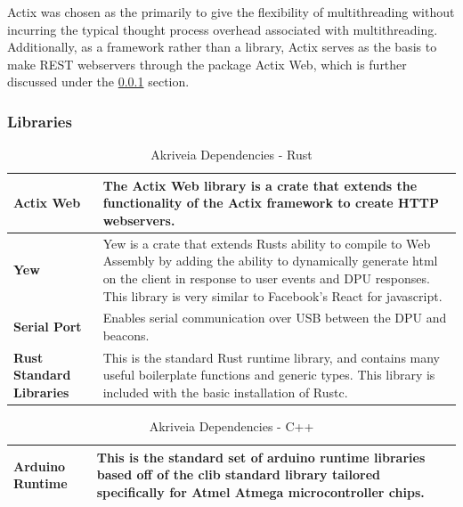 \bigskip
Actix was chosen as the primarily to give the flexibility of multithreading without incurring the typical thought process overhead associated with multithreading. Additionally, as a framework rather than a library, Actix serves as the basis to make REST webservers through the package \Gls{Actix Web}, which is further discussed under the \ref{software_libraries} section.

\subsubsection{Libraries}
\label{software_libraries}

\begin{table}[H]
\centering
\begin{tabular}{ | m{3.25cm} | m{12.5cm} |}
	\hline
	\textbf{Actix Web} & The Actix Web library is a crate that extends the functionality of the Actix framework to create \Gls{HTTP} webservers. \\
	\hline
	\textbf{Yew} & Yew is a crate that extends Rusts ability to compile to Web Assembly by adding the ability to dynamically generate html on the client in response to user events and DPU responses. This library is very similar to Facebook's React for javascript. \\
	\hline
	\textbf{Serial Port} & Enables serial communication over USB between the DPU and beacons.\\
	\hline
	\textbf{Rust Standard Libraries} & This is the standard Rust runtime library, and contains many useful boilerplate functions and generic types. This library is included with the basic installation of Rustc. \\
	\hline
\end{tabular}
\caption{Akriveia Dependencies - Rust}
\end{table}

\begin{table}[H]
\centering
\begin{tabular}{ | m{3.25cm} | m{12.5cm} |}
	\hline
	\textbf{Arduino Runtime} & This is the standard set of arduino runtime libraries based off of the clib standard library tailored specifically for Atmel Atmega microcontroller chips. \\
	\hline
\end{tabular}
\caption{Akriveia Dependencies - C++}
\end{table}

